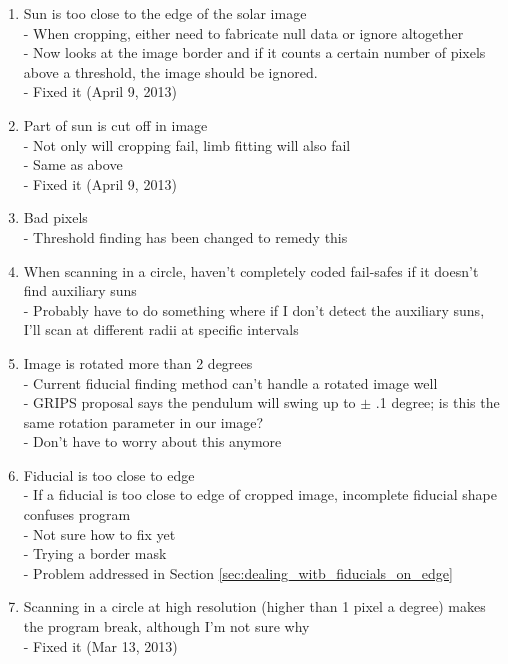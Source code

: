 \documentclass[10pt]{scrartcl}
\begin{document}
    \begin{enumerate}
        \item Sun is too close to the edge of the solar image\\
            - When cropping, either need to fabricate null data or ignore altogether\\
            - Now looks at the image border and if it counts a certain number of pixels above a threshold, the image should be ignored.\\
            - Fixed it (April 9, 2013)
        \item Part of sun is cut off in image\\
            - Not only will cropping fail, limb fitting will also fail\\
            - Same as above\\
            - Fixed it (April 9, 2013)
        \item Bad pixels\\
            - Threshold finding has been changed to remedy this
        \item When scanning in a circle, haven't completely coded fail-safes if it doesn't find auxiliary suns\\
            - Probably have to do something where if I don't detect the auxiliary suns, I'll scan at different radii at specific intervals
        \item Image is rotated more than 2 degrees\\
            - Current fiducial finding method can't handle a rotated image well\\
            - GRIPS proposal says the pendulum will swing up to $\pm$ .1 degree; is this the same rotation parameter in our image?\\
            - Don't have to worry about this anymore
        \item Fiducial is too close to edge\\
            - If a fiducial is too close to edge of cropped image, incomplete fiducial shape confuses program\\
            - Not sure how to fix yet\\
            - Trying a border mask\\
            - Problem addressed in Section \ref{sec:dealing_witb_fiducials_on_edge}
        \item Scanning in a circle at high resolution (higher than 1 pixel a degree) makes the program   break, although I'm not sure why\\
            - Fixed it (Mar 13, 2013)
    \end{enumerate}

\end{document}
